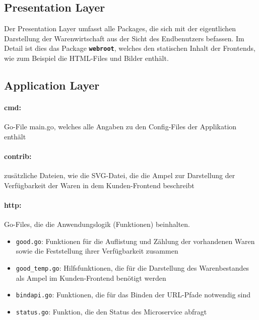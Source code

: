 \newpage
\subsection{Presentation Layer}
\label{subsec: Presentation Layer}
Der Presentation Layer umfasst alle  Packages, die sich mit der eigentlichen Darstellung der Warenwirtschaft aus der Sicht des Endbenutzers befassen. Im Detail ist dies das Package \textbf{\texttt{webroot}}, welches den statischen Inhalt der Frontends, wie zum Beispiel die HTML-Files und Bilder enthält.


\subsection{Application Layer}
\label{subsec: Application Layer}

\paragraph{cmd:} Go-File main.go, welches alle Angaben zu den Config-Files der Applikation enthält

\paragraph{contrib:} zusätzliche Dateien, wie die SVG-Datei, die die Ampel zur Darstellung der Verfügbarkeit der Waren in dem Kunden-Frontend beschreibt


\paragraph{http:} Go-Files, die die Anwendungslogik (Funktionen) beinhalten.
	\begin{itemize}
	\item \texttt{good.go}: Funktionen für die Auflistung und Zählung der vorhandenen Waren sowie die Feststellung ihrer Verfügbarkeit zusammen
	\item \texttt{good\_temp.go}: Hilfsfunktionen, die für die Darstellung des Warenbestandes als Ampel im Kunden-Frontend benötigt werden
	\item \texttt{bindapi.go}: Funktionen, die für das Binden der URL-Pfade notwendig sind
	\item \texttt{status.go}: Funktion, die den Status des Microservice abfragt 
	\end{itemize}


